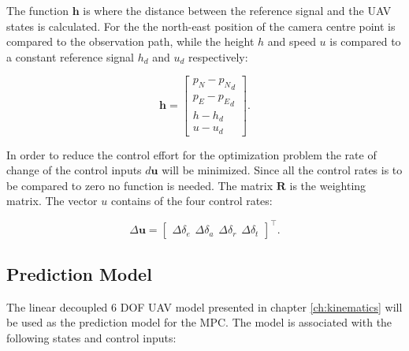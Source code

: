 The function $\mathbf{h}$ is where the distance between the reference signal and the UAV states is calculated. For the the north-east position of the camera centre point is compared to the observation path, while the height $h$ and speed $u$ is compared to a constant reference signal $h_d$ and $u_d$ respectively:

\begin{equation}
	\mathbf{h} =
	\begin{bmatrix}
		p_N - {p_N}_d \\
		p_E - {p_E}_d \\
		h - h_d \\
		u - u_d
	\end{bmatrix}.
\end{equation}

In order to reduce the control effort for the optimization problem the rate of change of the control inputs $d\mathbf{u}$ will be minimized. Since all the control rates is to be compared to zero no function is needed. The matrix $\mathbf{R}$ is the weighting matrix. The vector $u$ contains of the four control rates:

\begin{equation}
	\label{eq:control_rates}
	\Delta\mathbf{u} = 
	\begin{bmatrix}
		\Delta\delta_e \hspace{5pt} \Delta\delta_a \hspace{5pt} \Delta\delta_r \hspace{5pt} \Delta\delta_t
	\end{bmatrix} ^\intercal .
\end{equation}


\subsection{Prediction Model}

The linear decoupled 6 DOF UAV model presented in chapter \ref{ch:kinematics} will be used as the prediction model for the MPC. The model is associated with the following states and control inputs:

